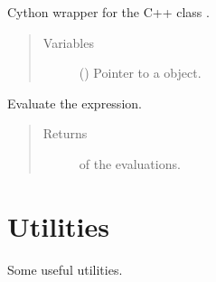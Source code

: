 \documentclass[letterpaper,10pt,english]{sphinxmanual}
\begin{document}
\begin{fulllineitems}
\label{\detokenize{api:grids.parser.parser_1d.Parser1d}}
Cython wrapper for the C++ class .
\begin{quote}\begin{description}
\item[{Variables}] \leavevmode
{} () \textendash{} Pointer to a  object.

\end{description}\end{quote}

\begin{fulllineitems}
\label{\detokenize{api:grids.parser.parser_1d.Parser1d.evaluate}}
Evaluate the expression.
\begin{quote}\begin{description}
\item[{Returns}] \leavevmode
{} of the evaluations.

\end{description}\end{quote}

\end{fulllineitems}


\end{fulllineitems}



\section{Utilities}
\label{\detokenize{api:module-utils}}\label{\detokenize{api:utilities}}
Some useful utilities.
\end{document}
